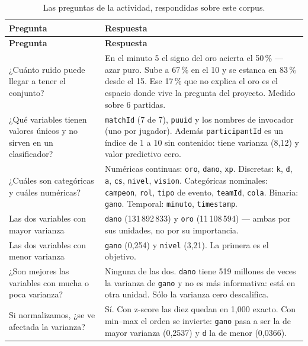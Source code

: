 \documentclass[11pt,letterpaper]{article}
\begin{document}
\begin{longtable}{p{6.4cm}p{8.6cm}}
\caption{Las preguntas de la actividad, respondidas sobre este corpus.}\\
\toprule
\textbf{Pregunta} & \textbf{Respuesta} \\
\midrule
\endfirsthead
\toprule
\textbf{Pregunta} & \textbf{Respuesta} \\
\midrule
\endhead
¿Cuánto ruido puede llegar a tener el conjunto? &
En el minuto 5 el signo del oro acierta el 50\,\% — azar puro. Sube a 67\,\% en el
10 y se estanca en 83\,\% desde el 15. Ese 17\,\% que no explica el oro es el
espacio donde vive la pregunta del proyecto. Medido sobre 6 partidas. \\
\addlinespace
¿Qué variables tienen valores únicos y no sirven en un clasificador? &
\texttt{matchId} (7 de 7), \texttt{puuid} y los nombres de invocador (uno por
jugador). Además \texttt{participantId} es un índice de 1 a 10 sin contenido:
tiene varianza (8,12) y valor predictivo cero. \\
\addlinespace
¿Cuáles son categóricas y cuáles numéricas? &
Numéricas continuas: \texttt{oro}, \texttt{dano}, \texttt{xp}. Discretas:
\texttt{k}, \texttt{d}, \texttt{a}, \texttt{cs}, \texttt{nivel}, \texttt{vision}.
Categóricas nominales: \texttt{campeon}, \texttt{rol}, \texttt{tipo} de evento,
\texttt{teamId}, \texttt{cola}. Binaria: \texttt{gano}. Temporal: \texttt{minuto},
\texttt{timestamp}. \\
\addlinespace
Las dos variables con mayor varianza &
\texttt{dano} (131\,892\,833) y \texttt{oro} (11\,108\,594) —
ambas por sus unidades, no por su importancia. \\
\addlinespace
Las dos variables con menor varianza &
\texttt{gano} (0,254) y \texttt{nivel} (3,21). La primera es el objetivo. \\
\addlinespace
¿Son mejores las variables con mucha o poca varianza? &
Ninguna de las dos. \texttt{dano} tiene 519 millones de veces la varianza de
\texttt{gano} y no es más informativa: está en otra unidad. Sólo la varianza cero
descalifica. \\
\addlinespace
Si normalizamos, ¿se ve afectada la varianza? &
Sí. Con z-score las diez quedan en 1,000 exacto. Con min--max el orden se invierte:
\texttt{gano} pasa a ser la de mayor varianza (0,2537) y \texttt{d} la de menor
(0,0366). \\
\bottomrule
\end{longtable}

\end{document}
